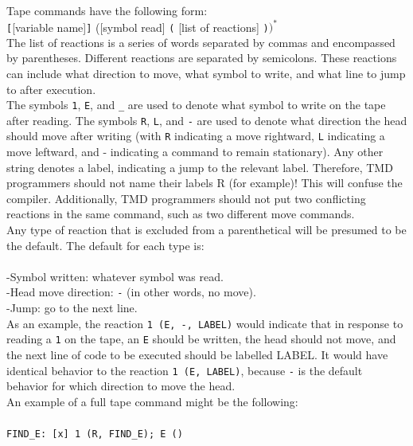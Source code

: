 \documentclass[11pt]{article}
\begin{document}
Tape commands have the following form: \\

\texttt{[}[variable name]\texttt{]} ([symbol read] \texttt{(} [list of reactions] \texttt{)}$)^*$ \\

The list of reactions is a series of words separated by commas and encompassed by parentheses. Different reactions are separated by semicolons. These reactions can include what direction to move, what symbol to write, and what line to jump to after execution. \\

The symbols \texttt{1}, \texttt{E}, and \texttt{\_} are used to denote what symbol to write on the tape after reading. The symbols \texttt{R}, \texttt{L}, and \texttt{-} are used to denote what direction the head should move after writing (with \texttt{R} indicating a move rightward, \texttt{L} indicating a move leftward, and \textrm{-} indicating a command to remain stationary). Any other string denotes a label, indicating a jump to the relevant label. Therefore, TMD programmers should not name their labels \textrm{R} (for example)! This will confuse the compiler. Additionally, TMD programmers should not put two conflicting reactions in the same command, such as two different move commands. \\

Any type of reaction that is excluded from a parenthetical will be presumed to be the default. The default for each type is: \\ \\
-Symbol written: whatever symbol was read. \\
-Head move direction: \texttt{-} (in other words, no move). \\
-Jump: go to the next line. \\

As an example, the reaction \texttt{1 (E, -, LABEL)} would indicate that in response to reading a \texttt{1} on the tape, an \texttt{E} should be written, the head should not move, and the next line of code to be executed should be labelled LABEL. It would have identical behavior to the reaction \texttt{1 (E, LABEL)}, because \texttt{-} is the default behavior for which direction to move the head. \\

An example of a full tape command might be the following: \\ \\
\texttt{FIND\_E: [x] 1 (R, FIND\_E); E ()} \\
\end{document}
